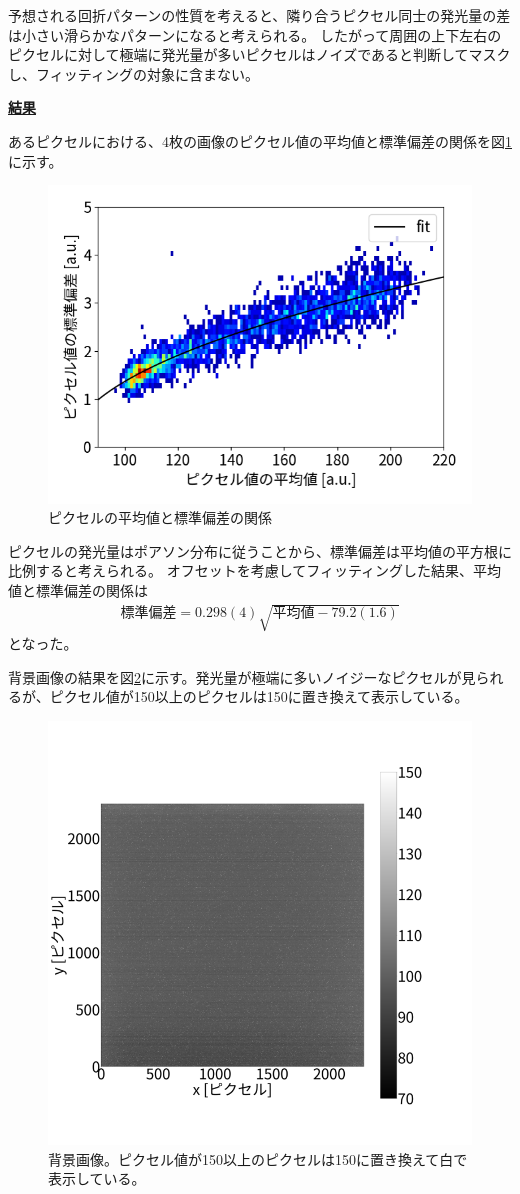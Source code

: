 \documentclass[a4paper,11pt,uplatex]{jsbook}
\begin{document}
予想される回折パターンの性質を考えると、隣り合うピクセル同士の発光量の差は小さい滑らかなパターンになると考えられる。
したがって周囲の上下左右のピクセルに対して極端に発光量が多いピクセルはノイズであると判断してマスクし、フィッティングの対象に含まない。

\noindent \textbf{\underline{結果}}\par
あるピクセルにおける、4枚の画像のピクセル値の平均値と標準偏差の関係を図\ref{pixel}に示す。
\begin{figure}[h]
  \centering
  \includegraphics[width=0.8\linewidth]{image/4-pixel.png}
  \caption{ピクセルの平均値と標準偏差の関係}\label{pixel}
\end{figure}

ピクセルの発光量はポアソン分布に従うことから、標準偏差は平均値の平方根に比例すると考えられる。
オフセットを考慮してフィッティングした結果、平均値と標準偏差の関係は
\begin{eqnarray}
  \text{標準偏差} = 0.298(4) \sqrt{\text{平均値} - 79.2(1.6) } 
\end{eqnarray}
となった。

背景画像の結果を図\ref{BG}に示す。発光量が極端に多いノイジーなピクセルが見られるが、ピクセル値が150以上のピクセルは150に置き換えて表示している。
\begin{figure}[H]
  \centering
  \includegraphics[width=0.8\linewidth]{image/4-BG.png}
  \caption[背景画像]{背景画像。ピクセル値が150以上のピクセルは150に置き換えて白で表示している。}\label{BG}
\end{figure}
\end{document}
